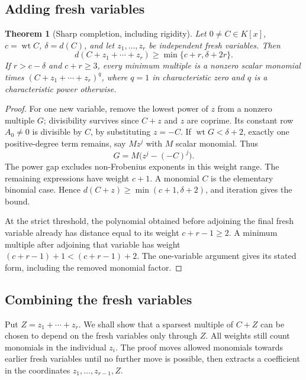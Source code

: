 \documentclass[11pt]{article}
\DeclareMathOperator{\wt}{wt}\DeclareMathOperator{\ord}{ord}
\numberwithin{equation}{section}
\newtheorem{theorem}{Theorem}[section]
\theoremstyle{definition}\newtheorem{definition}[theorem]{Definition}
\theoremstyle{remark}\newtheorem{remark}[theorem]{Remark}
\begin{document}
\subsection{Adding fresh variables}
\begin{theorem}[Sharp completion, including rigidity]\label{thm:completion}
Let $0\ne C\in K[x]$, $c=\wt C$, $\delta=d(C)$, and let
$z_1,\ldots,z_r$ be independent fresh variables. Then
\[
 d(C+z_1+\cdots+z_r)\ge\min\{c+r,\delta+2r\}.
\]
If $r>c-\delta$ and $c+r\ge3$, every minimum multiple is a nonzero
scalar monomial times $(C+z_1+\cdots+z_r)^q$, where $q=1$ in
characteristic zero and $q$ is a characteristic power otherwise.
\end{theorem}
\begin{proof}
For one new variable, remove the lowest power of $z$ from a nonzero
multiple $G$; divisibility survives since $C+z$ and $z$ are coprime.
Its constant row $A_0\ne0$ is divisible by $C$, by substituting $z=-C$.
If $\wt G<\delta+2$, exactly one positive-degree term remains, say
$Mz^j$ with $M$ scalar monomial. Thus
\[
 G=M\bigl(z^j-(-C)^j\bigr).
\]
The power gap excludes non-Frobenius exponents in this weight range.
The remaining expressions have weight $c+1$. A monomial $C$ is the
elementary binomial case. Hence $d(C+z)\ge\min(c+1,\delta+2)$, and
iteration gives the bound.

At the strict threshold, the polynomial obtained before adjoining
the final fresh variable already has distance equal to its weight
$c+r-1\ge2$. A minimum multiple after adjoining that variable has
weight $(c+r-1)+1<(c+r-1)+2$. The one-variable argument gives its
stated form, including the removed monomial factor.
\end{proof}


\subsection{Combining the fresh variables}

Put $Z=z_1+\cdots+z_r$. We shall show that a sparsest multiple of
$C+Z$ can be chosen to depend on the fresh variables only through
$Z$. All weights still count monomials in the individual $z_i$.
The proof moves allowed monomials towards earlier fresh variables
until no further move is possible, then extracts a coefficient in
the coordinates $z_1,\ldots,z_{r-1},Z$.
\end{document}

